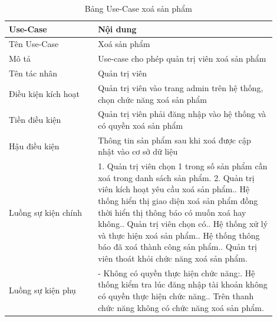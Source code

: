 \begin{longtable}[htp]{ |m{0.3\linewidth}|m{0.6\linewidth}|}
 \caption{Bảng Use-Case xoá sản phẩm \label{long}}\\
 \hline
 Use-Case & Nội dung \\
 \hline
 Tên Use-Case & Xoá sản phẩm \\
 \hline
 Mô tả & Use-case cho phép quản trị viên xoá sản phẩm\\
 \hline
 Tên tác nhân & Quản trị viên\\
 \hline
 Điều kiện kích hoạt & Quản trị viên vào trang admin trên hệ thống, chọn chức năng xoá sản phẩm\\
 \hline
 Tiền điều kiện & Quản trị viên phải đăng nhập vào hệ thống và có quyền xoá sản phẩm\\
 \hline
 Hậu điều kiện & Thông tin sản phẩm sau khi xoá được cập nhật vào cơ sở dữ liệu\\
 \hline
 Luồng sự kiện chính & 
 1. Quản trị viên chọn 1 trong số sản phẩm cần xoá trong danh sách sản phẩm.
 2. Quản trị viên kích hoạt yêu cầu xoá sản phẩm.\newline
 3. Hệ thống hiển thị giao diện xoá sản phẩm đồng thời hiển thị thông báo có muốn xoá hay không.\newline
 4. Quản trị viên chọn có.\newline
 5. Hệ thống xử lý và thực hiện xoá sản phẩm.\newline
 6. Hệ thống thông báo đã xoá thành công sản phẩm.\newline	
 7. Quản trị viên thoát khỏi chức năng xoá sản phẩm.
 \\
 \hline
 Luồng sự kiện phụ & 
  - Không có quyền thực hiện chức năng:\newline
  1. Hệ thống kiểm tra lúc đăng nhập tài khoản không có quyền thực hiện chức năng.\newline
  2. Trên thanh chức năng không có chức năng xoá sản phẩm.
 \\
 \hline
\end{longtable}

